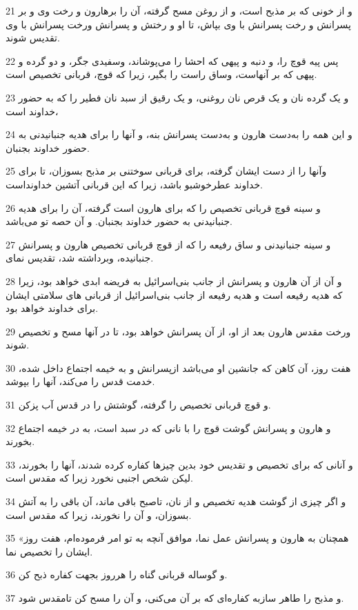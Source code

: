 \par 21 و از خونی که بر مذبح است، و از روغن مسح گرفته، آن را برهارون و رخت وی و بر پسرانش و رخت پسرانش با وی بپاش، تا او و رختش و پسرانش ورخت پسرانش با وی تقدیس شوند.
\par 22 پس پیه قوچ را، و دنبه و پیهی که احشا را می‌پوشاند، وسفیدی جگر، و دو گرده و پیهی که بر آنهاست، وساق راست را بگیر، زیرا که قوچ، قربانی تخصیص است.
\par 23 و یک گرده نان و یک قرص نان روغنی، و یک رقیق از سبد نان فطیر را که به حضور خداوند است،
\par 24 و این همه را به‌دست هارون و به‌دست پسرانش بنه، و آنها را برای هدیه جنبانیدنی به حضور خداوند بجنبان.
\par 25 وآنها را از دست ایشان گرفته، برای قربانی سوختنی بر مذبح بسوزان، تا برای خداوند عطرخوشبو باشد، زیرا که این قربانی آتشین خداونداست.
\par 26 و سینه قوچ قربانی تخصیص را که برای هارون است گرفته، آن را برای هدیه جنبانیدنی به حضور خداوند بجنبان. و آن حصه تو می‌باشد.
\par 27 و سینه جنبانیدنی و ساق رفیعه را که از قوچ قربانی تخصیص هارون و پسرانش جنبانیده، وبرداشته شد، تقدیس نمای.
\par 28 و آن از آن هارون و پسرانش از جانب بنی‌اسرائیل به فریضه ابدی خواهد بود، زیرا که هدیه رفیعه است و هدیه رفیعه از جانب بنی‌اسرائیل از قربانی های سلامتی ایشان برای خداوند خواهد بود.
\par 29 ورخت مقدس هارون بعد از او، از آن پسرانش خواهد بود، تا در آنها مسح و تخصیص شوند.
\par 30 هفت روز، آن کاهن که جانشین او می‌باشد ازپسرانش و به خیمه اجتماع داخل شده، خدمت قدس را می‌کند، آنها را بپوشد.
\par 31 و قوچ قربانی تخصیص را گرفته، گوشتش را در قدس آب پزکن.
\par 32 و هارون و پسرانش گوشت قوچ را با نانی که در سبد است، به در خیمه اجتماع بخورند.
\par 33 و آنانی که برای تخصیص و تقدیس خود بدین چیزها کفاره کرده شدند، آنها را بخورند، لیکن شخص اجنبی نخورد زیرا که مقدس است.
\par 34 و اگر چیزی از گوشت هدیه تخصیص و از نان، تاصبح باقی ماند، آن باقی را به آتش بسوزان، و آن را نخورند، زیرا که مقدس است.
\par 35 «همچنان به هارون و پسرانش عمل نما، موافق آنچه به تو امر فرموده‌ام، هفت روز ایشان را تخصیص نما.
\par 36 و گوساله قربانی گناه را هرروز بجهت کفاره ذبح کن.
\par 37 و مذبح را طاهر سازبه کفاره‌ای که بر آن می‌کنی، و آن را مسح کن تامقدس شود.

